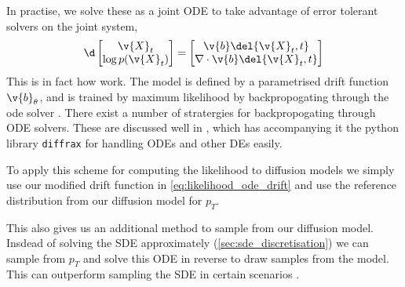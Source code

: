 In practise, we solve these as a joint ODE to take advantage of error tolerant solvers on the joint system,
\[
	\d 
	\begin{bmatrix}
		\v{X}_t \\ \log p(\v{X}_t)
	\end{bmatrix} = 
	\begin{bmatrix}
		\v{b}\del{\v{X}_t, t} \\ \nabla \cdot \v{b} \del{\v{X}_t, t}
	\end{bmatrix}
\]
This is in fact how  \parencite{chen2018neural} work. 
The model is defined by a parametrised drift function \(\v{b}_\theta\), and is trained by maximum likelihood by backpropogating through the ode solver \parencite{chen2018neural}. 
There exist a number of stratergies for backpropogating through ODE solvers.
These are discussed well in \textcite{kidger2021on}, which has accompanying it the python library \verb|diffrax|  for handling ODEs and other DEs easily.

To apply this scheme for computing the likelihood to diffusion models we simply use our modified drift function in \cref{eq:likelihood_ode_drift} and use the reference distribution from our diffusion model for \(p_T\).

This also gives us an additional method to sample from our diffusion model. 
Insdead of solving the SDE approximately (\cref{sec:sde_discretisation}) we can sample from \(p_T\) and solve this ODE in reverse to draw samples from the model.
This can outperform sampling the SDE in certain scenarios \parencite{karras2022Elucidating,song2019generative}.
